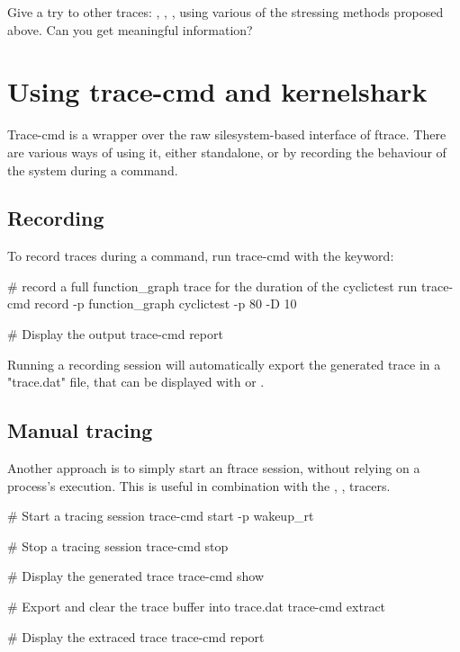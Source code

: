 Give a try to other traces: , , ,
using various of the stressing methods proposed above. Can you get meaningful information?

\section{Using trace-cmd and kernelshark}

Trace-cmd is a wrapper over the raw silesystem-based interface of ftrace. There
are various ways of using it, either standalone, or by recording the behaviour
of the system during a command.

\subsection{Recording}

To record traces during a command, run trace-cmd with the  keyword:

\begin{bashinput}
# record a full function_graph trace for the duration of the cyclictest run
trace-cmd record -p function_graph cyclictest -p 80 -D 10

# Display the output
trace-cmd report
\end{bashinput}

Running a recording session will automatically export the generated trace in a
"trace.dat" file, that can be displayed with  or .

\subsection{Manual tracing}

Another approach is to simply start an ftrace session, without relying on a process's
execution. This is useful in combination with the , ,  tracers.

\begin{bashinput}
        # Start a tracing session
        trace-cmd start -p wakeup_rt

        # Stop a tracing session
        trace-cmd stop

        # Display the generated trace
        trace-cmd show

        # Export and clear the trace buffer into trace.dat
        trace-cmd extract

        # Display the extraced trace
        trace-cmd report
\end{bashinput}

